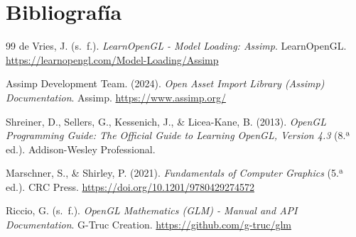 \newpage
\section*{Bibliografía}

\begin{thebibliography}{99}
	de Vries, J. (s.~f.). \textit{LearnOpenGL - Model Loading: Assimp}. LearnOpenGL. \url{https://learnopengl.com/Model-Loading/Assimp}
	
	Assimp Development Team. (2024). \textit{Open Asset Import Library (Assimp) Documentation}. Assimp. \url{https://www.assimp.org/}
	
	Shreiner, D., Sellers, G., Kessenich, J., \& Licea-Kane, B. (2013). \textit{OpenGL Programming Guide: The Official Guide to Learning OpenGL, Version 4.3} (8.ª ed.). Addison-Wesley Professional.
	
	Marschner, S., \& Shirley, P. (2021). \textit{Fundamentals of Computer Graphics} (5.ª ed.). CRC Press. \url{https://doi.org/10.1201/9780429274572}
	
	Riccio, G. (s.~f.). \textit{OpenGL Mathematics (GLM) - Manual and API Documentation}. G-Truc Creation. \url{https://github.com/g-truc/glm}
\end{thebibliography}